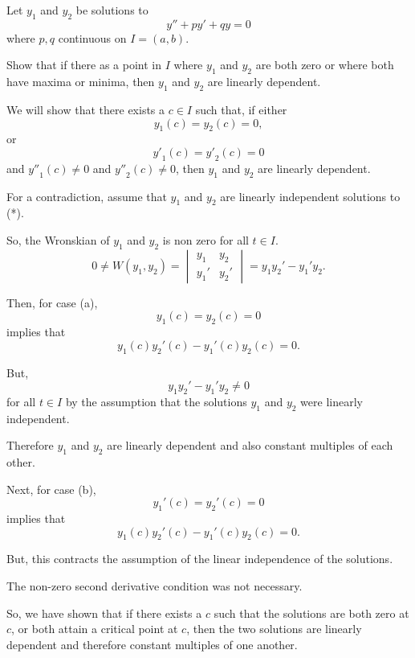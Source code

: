 \documentclass[../hw6]{subfiles}
\begin{document}
Let $y_1$ and $y_2$ be solutions to 
\begin{equation*}
    y''+py'+qy=0 \tag{*}
\end{equation*}
where $p,q$ continuous on $I=(a,b)$.

Show that if there as a point in $I$ where $y_1$ and $y_2$ are both zero or where both have maxima or minima, then $y_1$ and $y_2$ are linearly dependent. 

We will show that there exists a $c \in I$ such that, if either 
\[y_1(c)=y_2(c)=0,\tag{a}\] or 
\[{y'}_1(c)={y'}_2(c)=0\tag{a}\] and ${y''}_1(c)\neq0$ and ${y''}_2(c)\neq0$, 
then $y_1$ and $y_2$ are linearly dependent.

For a contradiction, assume that $y_1$ and $y_2$ are linearly independent solutions to (*). 

So, the Wronskian of $y_1$ and $y_2$ is non zero for all $t\in I$.
\[0 \neq W(y_1, y_2) = \begin{vmatrix}
    y_1 & y_2 \\
    y_1' & y_2'
\end{vmatrix}
= y_1 y_2' - y_1'y_2.\]

Then, for case (a), \[y_1(c)=y_2(c)=0\] implies that
\[y_1(c)y_2'(c) - y_1'(c)y_2(c)=0.\]

But, \[y_1 y_2' - y_1'y_2\neq0\] for all $t\in I$ by the assumption that the solutions $y_1$ and $y_2$ were linearly independent.

Therefore $y_1$ and $y_2$ are linearly dependent and also constant multiples of each other.

Next, for case (b), \[y_1'(c)=y_2'(c)=0\] implies that 
\[y_1(c)y_2'(c) - y_1'(c)y_2(c)=0.\]

But, this contracts the assumption of the linear independence of the solutions.

The non-zero second derivative condition was not necessary. 

So, we have shown that if there exists a $c$ such that the solutions are both zero at $c$, or both attain a critical point at $c$, then the two solutions are linearly dependent and therefore constant multiples of one another.
\end{document}
